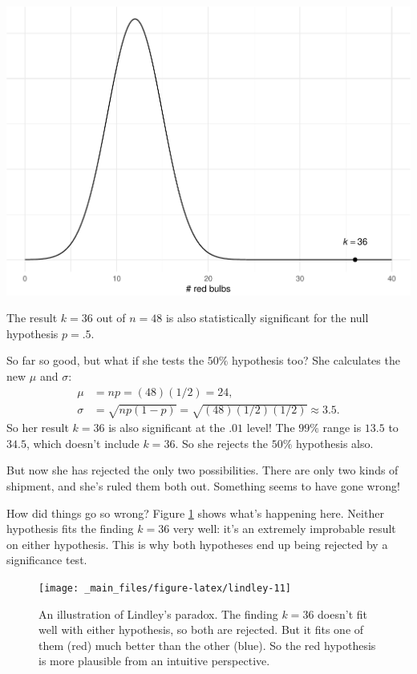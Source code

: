 \documentclass[justified]{tufte-book}
\theoremstyle{definition}
\theoremstyle{definition}
\theoremstyle{definition}
\theoremstyle{remark}
\begin{document}
\begin{marginfigure}
\includegraphics{_main_files/figure-latex/unnamed-chunk-154-1} \caption[The result $k = 36$ out of $n = 48$ is also statistically significant for the null hypothesis $p = .5$]{The result $k = 36$ out of $n = 48$ is also statistically significant for the null hypothesis $p = .5$.}\label{fig:unnamed-chunk-154}
\end{marginfigure}

So far so good, but what if she tests the \(50\%\) hypothesis too? She
calculates the new \(\mu\) and \(\sigma\): \[
  \begin{aligned}
    \mu &= np = (48)(1/2) = 24,\\
    \sigma &= \sqrt{np(1-p)} = \sqrt{(48)(1/2)(1/2)} \approx 3.5.
  \end{aligned}
\] So her result \(k = 36\) is also significant at the \(.01\) level!
The \(99\%\) range is \(13.5\) to \(34.5\), which doesn't include
\(k = 36\). So she rejects the \(50\%\) hypothesis also.

But now she has rejected the only two possibilities. There are only two
kinds of shipment, and she's ruled them both out. Something seems to
have gone wrong!

How did things go so wrong? Figure \ref{fig:lindley} shows what's
happening here. Neither hypothesis fits the finding \(k = 36\) very
well: it's an extremely improbable result on either hypothesis. This is
why both hypotheses end up being rejected by a significance test.

\begin{figure}
\texttt{[image: \_main\_files/figure-latex/lindley-11]} \caption[An illustration of Lindley's paradox]{An illustration of Lindley's paradox. The finding $k = 36$ doesn't fit well with either hypothesis, so both are rejected. But it fits one of them (red) much better than the other (blue). So the red hypothesis is more plausible from an intuitive perspective.}\label{fig:lindley}
\end{figure}
\end{document}
